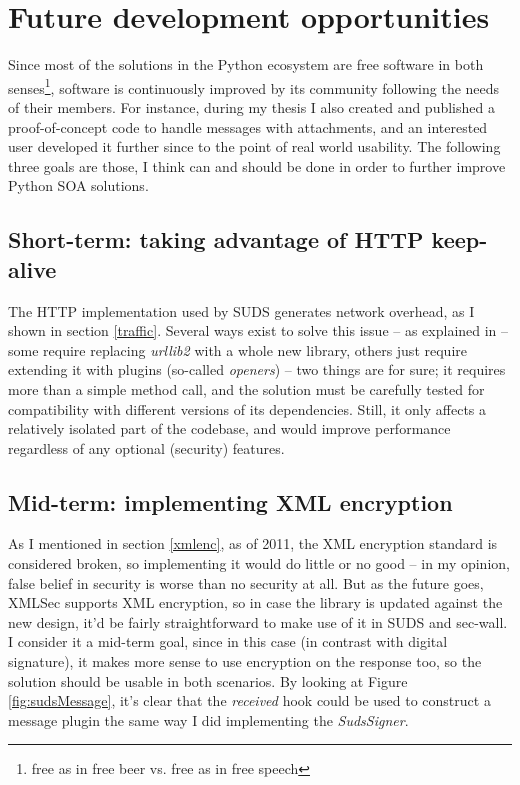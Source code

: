 \section{Future development opportunities}

Since most of the solutions in the Python ecosystem are free software in both senses\footnote{free as in free beer vs. free as in free speech}, software is continuously improved by its community following the needs of their members. For instance, during my thesis I also created and published a proof-of-concept code to handle messages with attachments, and an interested user developed it further since to the point of real world usability. The following three goals are those, I think can and should be done in order to further improve Python SOA solutions.

\subsection{Short-term: taking advantage of HTTP keep-alive}
\label{keepalive}

The HTTP implementation used by SUDS generates network overhead, as I shown in section \ref{traffic}. Several ways exist to solve this issue -- as explained in \cite{so-1037406} -- some require replacing \emph{urllib2} with a whole new library, others just require extending it with plugins (so-called \emph{openers}) -- two things are for sure; it requires more than a simple method call, and the solution must be carefully tested for compatibility with different versions of its dependencies. Still, it only affects a relatively isolated part of the codebase, and would improve performance regardless of any optional (security) features.

\subsection{Mid-term: implementing XML encryption}

As I mentioned in section \ref{xmlenc}, as of 2011, the XML encryption standard is considered broken, so implementing it would do little or no good -- in my opinion, false belief in security is worse than no security at all. But as the future goes, XMLSec supports XML encryption, so in case the library is updated against the new design, it'd be fairly straightforward to make use of it in SUDS and sec-wall. I consider it a mid-term goal, since in this case (in contrast with digital signature), it makes more sense to use encryption on the response too, so the solution should be usable in both scenarios. By looking at Figure \ref{fig:sudsMessage}, it's clear that the \emph{received} hook could be used to construct a message plugin the same way I did implementing the \emph{SudsSigner}.

